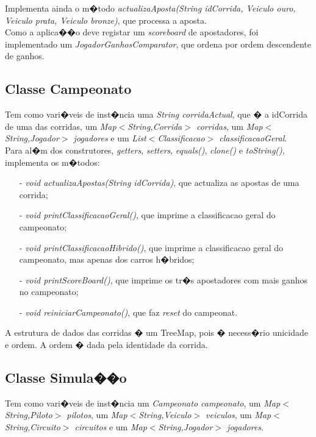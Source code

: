 ﻿\documentclass[10pt,notitlepage]{article}
\begin{document}
Implementa ainda o m�todo \textit{actualizaAposta(String idCorrida, Veiculo ouro, Veiculo prata, Veiculo bronze)}, que processa a aposta. \\

Como a aplica��o deve registar um \textit{scoreboard} de apostadores, foi implementado um \textit{JogadorGanhosComparator}, que ordena por ordem descendente de ganhos.

\newpage

\subsection{Classe Campeonato}

Tem como vari�veis de inst�ncia uma \textit{String corridaActual}, que � a idCorrida de uma das corridas, um \textit{Map$<$String,Corrida$>$ corridas}, um \textit{Map$<$String,Jogador$>$ jogadores} e um \textit{List$<$Classificacao$>$ classificacaoGeral}. \\

Para al�m dos construtores, \textit{getters}, \textit{setters}, \textit{equals()}, \textit{clone()} e \textit{toString()}, implementa os m�todos:

\begin{itemize}
\item[-] \textit{void actualizaApostas(String idCorrida)}, que actualiza as apostas de uma corrida;
\item[-] \textit{void printClassificacaoGeral()}, que imprime a classificacao geral do campeonato;
\item[-] \textit{void printClassificacaoHibrido()},  que imprime a classificacao geral do campeonato, mas apenas dos carros h�bridos;
\item[-] \textit{void printScoreBoard()}, que imprime os tr�s apostadores com mais ganhos no campeonato;
\item[-] \textit{void reiniciarCampeonato()}, que faz \textit{reset} do campeonat.
\end{itemize}

A estrutura de dados das corridas � um TreeMap, pois � necess�rio unicidade e ordem. A ordem � dada pela identidade da corrida.

\subsection{Classe Simula��o}

Tem como vari�veis de inst�ncia um \textit{Campeonato campeonato}, um \textit{Map$<$String,Piloto$>$ pilotos}, um \textit{Map$<$String,Veiculo$>$ veiculos}, um \textit{Map$<$String,Circuito$>$ circuitos} e um \textit{Map$<$String,Jogador$>$ jogadores}. \\
\end{document}
